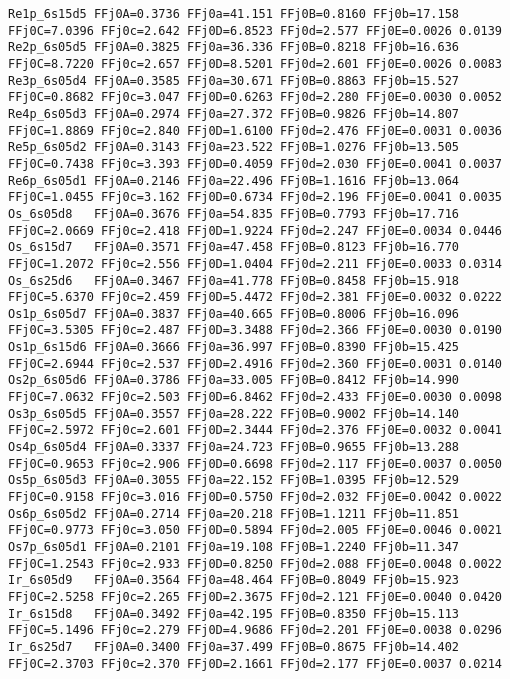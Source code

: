 {\begin{verbatim}
Re1p_6s15d5 FFj0A=0.3736 FFj0a=41.151 FFj0B=0.8160 FFj0b=17.158 FFj0C=7.0396 FFj0c=2.642 FFj0D=6.8523 FFj0d=2.577 FFj0E=0.0026 0.0139
Re2p_6s05d5 FFj0A=0.3825 FFj0a=36.336 FFj0B=0.8218 FFj0b=16.636 FFj0C=8.7220 FFj0c=2.657 FFj0D=8.5201 FFj0d=2.601 FFj0E=0.0026 0.0083
Re3p_6s05d4 FFj0A=0.3585 FFj0a=30.671 FFj0B=0.8863 FFj0b=15.527 FFj0C=0.8682 FFj0c=3.047 FFj0D=0.6263 FFj0d=2.280 FFj0E=0.0030 0.0052
Re4p_6s05d3 FFj0A=0.2974 FFj0a=27.372 FFj0B=0.9826 FFj0b=14.807 FFj0C=1.8869 FFj0c=2.840 FFj0D=1.6100 FFj0d=2.476 FFj0E=0.0031 0.0036
Re5p_6s05d2 FFj0A=0.3143 FFj0a=23.522 FFj0B=1.0276 FFj0b=13.505 FFj0C=0.7438 FFj0c=3.393 FFj0D=0.4059 FFj0d=2.030 FFj0E=0.0041 0.0037
Re6p_6s05d1 FFj0A=0.2146 FFj0a=22.496 FFj0B=1.1616 FFj0b=13.064 FFj0C=1.0455 FFj0c=3.162 FFj0D=0.6734 FFj0d=2.196 FFj0E=0.0041 0.0035
Os_6s05d8   FFj0A=0.3676 FFj0a=54.835 FFj0B=0.7793 FFj0b=17.716 FFj0C=2.0669 FFj0c=2.418 FFj0D=1.9224 FFj0d=2.247 FFj0E=0.0034 0.0446
Os_6s15d7   FFj0A=0.3571 FFj0a=47.458 FFj0B=0.8123 FFj0b=16.770 FFj0C=1.2072 FFj0c=2.556 FFj0D=1.0404 FFj0d=2.211 FFj0E=0.0033 0.0314
Os_6s25d6   FFj0A=0.3467 FFj0a=41.778 FFj0B=0.8458 FFj0b=15.918 FFj0C=5.6370 FFj0c=2.459 FFj0D=5.4472 FFj0d=2.381 FFj0E=0.0032 0.0222
Os1p_6s05d7 FFj0A=0.3837 FFj0a=40.665 FFj0B=0.8006 FFj0b=16.096 FFj0C=3.5305 FFj0c=2.487 FFj0D=3.3488 FFj0d=2.366 FFj0E=0.0030 0.0190
Os1p_6s15d6 FFj0A=0.3666 FFj0a=36.997 FFj0B=0.8390 FFj0b=15.425 FFj0C=2.6944 FFj0c=2.537 FFj0D=2.4916 FFj0d=2.360 FFj0E=0.0031 0.0140
Os2p_6s05d6 FFj0A=0.3786 FFj0a=33.005 FFj0B=0.8412 FFj0b=14.990 FFj0C=7.0632 FFj0c=2.503 FFj0D=6.8462 FFj0d=2.433 FFj0E=0.0030 0.0098
Os3p_6s05d5 FFj0A=0.3557 FFj0a=28.222 FFj0B=0.9002 FFj0b=14.140 FFj0C=2.5972 FFj0c=2.601 FFj0D=2.3444 FFj0d=2.376 FFj0E=0.0032 0.0041
Os4p_6s05d4 FFj0A=0.3337 FFj0a=24.723 FFj0B=0.9655 FFj0b=13.288 FFj0C=0.9653 FFj0c=2.906 FFj0D=0.6698 FFj0d=2.117 FFj0E=0.0037 0.0050
Os5p_6s05d3 FFj0A=0.3055 FFj0a=22.152 FFj0B=1.0395 FFj0b=12.529 FFj0C=0.9158 FFj0c=3.016 FFj0D=0.5750 FFj0d=2.032 FFj0E=0.0042 0.0022
Os6p_6s05d2 FFj0A=0.2714 FFj0a=20.218 FFj0B=1.1211 FFj0b=11.851 FFj0C=0.9773 FFj0c=3.050 FFj0D=0.5894 FFj0d=2.005 FFj0E=0.0046 0.0021
Os7p_6s05d1 FFj0A=0.2101 FFj0a=19.108 FFj0B=1.2240 FFj0b=11.347 FFj0C=1.2543 FFj0c=2.933 FFj0D=0.8250 FFj0d=2.088 FFj0E=0.0048 0.0022
Ir_6s05d9   FFj0A=0.3564 FFj0a=48.464 FFj0B=0.8049 FFj0b=15.923 FFj0C=2.5258 FFj0c=2.265 FFj0D=2.3675 FFj0d=2.121 FFj0E=0.0040 0.0420
Ir_6s15d8   FFj0A=0.3492 FFj0a=42.195 FFj0B=0.8350 FFj0b=15.113 FFj0C=5.1496 FFj0c=2.279 FFj0D=4.9686 FFj0d=2.201 FFj0E=0.0038 0.0296
Ir_6s25d7   FFj0A=0.3400 FFj0a=37.499 FFj0B=0.8675 FFj0b=14.402 FFj0C=2.3703 FFj0c=2.370 FFj0D=2.1661 FFj0d=2.177 FFj0E=0.0037 0.0214

\end{verbatim}}
